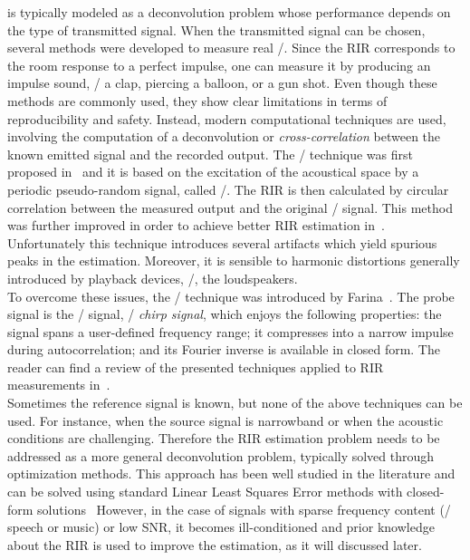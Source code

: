  is typically modeled as a deconvolution problem whose performance depends on the type of transmitted signal.
When the transmitted signal can be chosen, several methods were developed to measure real \RIRs/.
Since the \ac{RIR} corresponds to the room response to a perfect impulse, one can measure it by producing an impulse sound, \eg/ a clap, piercing a balloon, or a gun shot.
Even though these methods are commonly used, they show clear limitations in terms of reproducibility and safety.
Instead, modern computational techniques are used, involving the computation of a deconvolution or \textit{cross-correlation} between the known emitted signal and the recorded output.
The \MLSdef/ technique was first proposed in~ and it is based on the excitation of the acoustical space by a periodic pseudo-random signal, called \MLS/.
The \ac{RIR} is then calculated by circular correlation between the measured output and the original \MLS/ signal.
This method was further improved in order to achieve better \ac{RIR} estimation in~.
Unfortunately this technique introduces several artifacts which yield spurious peaks in the estimation.
Moreover, it is sensible to harmonic distortions generally introduced by playback devices, \eg/, the loudspeakers.
\\To overcome these issues, the \ESSdef/ technique was introduced by Farina~.
The probe signal is the \ESS/ signal, \aka/ \textit{chirp signal}, which enjoys the following properties:
the signal spans a user-defined frequency range; it compresses into a narrow impulse during autocorrelation; and its Fourier inverse is available in closed form.
The reader can find a review of the presented techniques applied to \ac{RIR} measurements in~.
\\Sometimes the reference signal is known, but none of the above techniques can be used.
For instance, when the source signal is narrowband or when the acoustic conditions are challenging.
Therefore the \ac{RIR} estimation problem needs to be addressed as a more general deconvolution problem, typically solved through optimization methods.
This approach has been well studied in the literature and can be solved using standard Linear Least Squares Error methods with closed-form solutions~
However, in the case of signals with sparse frequency content (\eg/ speech or music) or low SNR, it becomes ill-conditioned and prior knowledge about the \ac{RIR} is used to improve the estimation, as it will discussed later.


